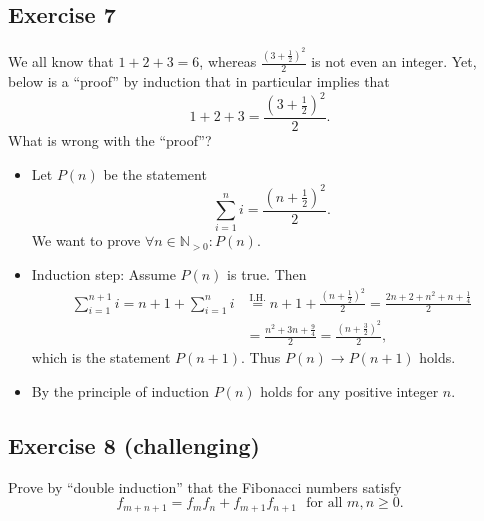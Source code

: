 \documentclass{amsart}
\newcommand{\N}{\mathbb{N}}
\theoremstyle{definition} \newtheorem*{definition}{Definition}
\theoremstyle{remark} \newtheorem*{ex}{Example}
\begin{document}
\subsection*{Exercise 7}
We all know that $1+2+3=6$, whereas $\frac{(3+\frac{1}{2})^2}{2}$ is not even an integer. Yet, below is a ``proof'' by induction that in particular implies that $$1+2+3=\frac{(3+\frac{1}{2})^2}{2}.$$ What is wrong with the ``proof''?
\begin{itemize}
\item Let $P(n)$ be the statement $$\sum_{i=1}^n i= \frac{(n+\frac{1}{2})^2}{2}.$$ We want to prove $\forall n\in\N_{>0}: P(n)$.
\item Induction step: Assume $P(n)$ is true. Then \begin{align*}\sum_{i=1}^{n+1} i = n+1+\sum_{i=1}^n i &\stackrel{\mathrm{I.H.}}{=}n+1+\frac{(n+\frac{1}{2})^2}{2}=\frac{2n+2+n^2 + n + \frac{1}{4}}{2}\\& = \frac{n^2+3n + \frac{9}{4}}{2}=\frac{(n+\frac{3}{2})^2}{2},\end{align*} which is the statement $P(n+1)$. Thus $P(n)\to P(n+1)$ holds.
\item By the principle of induction $P(n)$ holds for any positive integer $n$.
\end{itemize}

\subsection*{Exercise 8 (challenging)}
Prove by ``double induction'' that the Fibonacci numbers satisfy 
$$f_{m+n+1}=f_m f_n + f_{m+1}f_{n+1} \,\, \mbox{ for all } m,n\geq 0.$$
\end{document}
